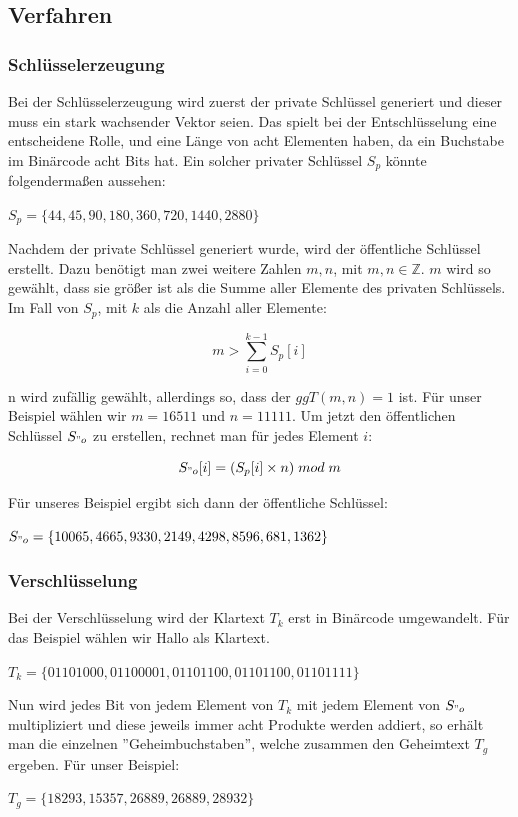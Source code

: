 \documentclass[a4paper,12pt,titlepage]{article}
\begin{document}
\subsection{Verfahren}
\subsubsection{Schlüsselerzeugung}
Bei der Schlüsselerzeugung wird zuerst der private Schlüssel generiert und dieser muss ein stark wachsender Vektor seien. Das spielt bei der Entschlüsselung eine entscheidene Rolle, und eine Länge von acht Elementen haben, da ein Buchstabe im Binärcode acht Bits hat. Ein solcher privater Schlüssel $S_p$ könnte folgendermaßen aussehen:
\begin{center}
$S_p=\{44,45,90,180,360,720,1440,2880\}$
\end{center}
Nachdem der private Schlüssel generiert wurde, wird der öffentliche Schlüssel erstellt. Dazu benötigt man zwei weitere Zahlen $m,n$, mit $m,n \in \mathbb{Z}$. $m$ wird so gewählt, dass sie größer ist als die Summe aller Elemente des privaten Schlüssels. Im Fall von $S_p$, mit $k$ als die Anzahl aller Elemente:
\begin{center}
\[m > \sum_{i=0}^{k-1} S_p[i]\]
\end{center}
n wird zufällig gewählt, allerdings so, dass der $ggT(m, n) = 1$ ist.
Für unser Beispiel wählen wir $m = 16511$ und $n = 11111$. Um jetzt den öffentlichen Schlüssel $S_{"o}$ zu erstellen, rechnet man für jedes Element $i$:
\begin{center}
\[S_{"o}[i]=(S_p[i] \times n)\; mod \; m\]
\end{center}
Für unseres Beispiel ergibt sich dann der öffentliche Schlüssel:
\begin{center}
$S_{"o}=\{10065,4665,9330,2149,4298,8596,681,1362\}$
\end{center}

\subsubsection{Verschlüsselung}
Bei der Verschlüsselung wird der Klartext $T_k$ erst in Binärcode umgewandelt. Für das Beispiel wählen wir Hallo als Klartext.
\begin{center}
$T_k = \{01101000, 01100001, 01101100, 01101100, 01101111\}$
\end{center}
Nun wird jedes Bit von jedem Element von $T_k$ mit jedem Element von $S_{"o}$ multipliziert und diese jeweils immer acht Produkte werden addiert, so erhält man die einzelnen ''Geheimbuchstaben'', welche zusammen den Geheimtext $T_g$ ergeben.
Für unser Beispiel:
\begin{center}
$T_g=\{18293,15357,26889,26889,28932\}$
\end{center}
\end{document}
